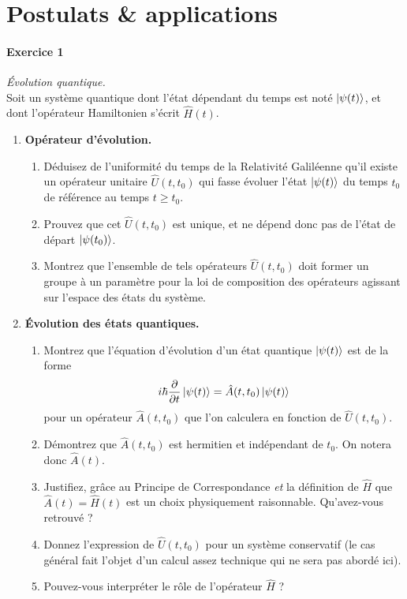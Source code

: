 \section{Postulats \& applications}

\paragraph{Exercice 1} \textit{Évolution quantique.}\\
Soit un système quantique dont l'état dépendant du temps est noté $\ket{\psi(t)}$, et dont l'opérateur Hamiltonien s'écrit $\hat H(t)$. 
\begin{enumerate}
\item \textbf{Opérateur d'évolution.}
\begin{enumerate}
\item Déduisez de l'uniformité du temps de la Relativité Galiléenne qu'il existe un opérateur unitaire $\hat U(t,t_0)$ qui fasse évoluer l'état $\ket{\psi(t)}$ du temps $t_0$ de référence au temps $t\geq t_0$. 
\item Prouvez que cet $\hat U(t,t_0)$ est unique, et ne dépend donc pas de l'état de départ $\ket{\psi(t_0)}$.
\item Montrez que l'ensemble de tels opérateurs $\hat U(t,t_0)$ doit former un groupe à un paramètre pour la loi de composition des opérateurs agissant sur l'espace des états du système.
\end{enumerate} 
\item \textbf{Évolution des états quantiques.}
\begin{enumerate}
\item Montrez que l'équation d'évolution d'un état quantique $\ket{\psi(t)}$ est de la forme 
\begin{equation}
i\hbar \frac{\partial}{\partial t}\ket{\psi(t)} = \hat A(t,t_0)\ket{\psi(t)}
\end{equation}
pour un opérateur $\hat A(t,t_0)$ que l'on calculera en fonction de $\hat U(t,t_0)$.
\item Démontrez que $\hat A(t,t_0)$ est hermitien et indépendant de $t_0$. On notera donc $\hat A(t)$.
\item Justifiez, grâce au Principe de Correspondance \textit{et} la définition de $\hat H$ que $\hat A(t) = \hat H(t)$ est un choix physiquement raisonnable. Qu'avez-vous retrouvé ?
\item Donnez l'expression de $\hat U(t,t_0)$ pour un système conservatif (le cas général fait l'objet d'un calcul assez technique qui ne sera pas abordé ici). 
\item Pouvez-vous interpréter le rôle de l'opérateur $\hat H$ ?
\end{enumerate}
\end{enumerate}



